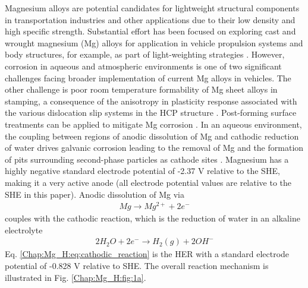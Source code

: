 Magnesium alloys are potential candidates for lightweight structural components in transportation industries and other applications due to their low density and high specific strength. Substantial effort has been focused on exploring cast and wrought magnesium (Mg) alloys for application in vehicle propulsion systems and body structures, for example, as part of light-weighting strategies \cite{luo2005development, luo2006wrought,carter2011structural, jekl2015development, luo2013magnesium}. However, corrosion in aqueous and atmospheric environments is one of two significant challenges facing broader implementation of current Mg alloys in vehicles. The other challenge is poor room temperature formability of Mg sheet alloys in stamping, a consequence of the anisotropy in plasticity response associated with the various dislocation slip systems in the \ac{HCP} structure \cite{yasi2010first}. Post-forming surface treatments can be applied to mitigate Mg corrosion \cite{zheng2005corrosion}. 
In an aqueous environment, the coupling between regions of anodic dissolution of Mg and cathodic reduction of water drives galvanic corrosion leading to the removal of Mg and the formation of pits surrounding second-phase particles as cathode sites \cite{birbilis2014evidence, zeng2006review}. Magnesium has a highly negative standard electrode potential of -2.37 V relative to the \ac{SHE}, making it a very active anode (all electrode potential values are relative to the \ac{SHE} in this paper). Anodic dissolution of Mg via 
\begin{align}
Mg \rightarrow Mg^{2+} + 2e^{-}
 \label{Chap:Mg_H:eq:anodic_dissolution}
\end{align}
couples with the cathodic reaction, which is the reduction of water in an alkaline electrolyte 
\begin{align}
2H_2O + 2e^{-} \rightarrow H_{2}(g) + 2OH^{-}
 \label{Chap:Mg_H:eq:cathodic_reaction}
\end{align}
Eq. \ref{Chap:Mg_H:eq:cathodic_reaction} is the \ac{HER} with a standard electrode potential of -0.828 V relative to \ac{SHE}. The overall reaction mechanism is illustrated in Fig. \ref{Chap:Mg_H:fig:1a}. 

